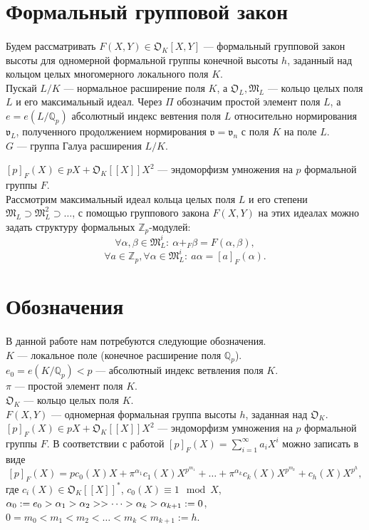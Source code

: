 \documentclass[a4paper]{article}
\newcommand{\Qp}{\mathbb{Q}_p}
\newcommand{\Zp}{\mathbb{Z}_p}
\newcommand{\ML}{\mathfrak{M}_L}
\newcommand{\OK}{\mathfrak{O}_K}
\newcommand{\OL}{\mathfrak{O}_L}
\newcommand{\val}{\mathfrak{v}}
\begin{document}
\section{Формальный групповой закон}
\paragraph{}
Будем рассматривать $F(X,Y)\in\OK[X,Y]$ --- формальный групповой закон высоты для одномерной формальной группы конечной высоты $h$, заданный над кольцом целых многомерного локального поля $K$.\\ 
Пускай $L/K$ --- нормальное расширение поля $K$, а $\OL,\ML$ --- кольцо целых поля $L$ и его максимальный идеал. Через $\Pi$ обозначим простой элемент поля $L$, а $e=e(L/\Qp)$ абсолютный индекс вевтения поля $L$ относительно нормирования $\val_L$, полученного продолжением нормирования $\val=\val_n$ с поля $K$ на поле $L$.\\
$G$ --- группа Галуа расширения $L/K$.

$[p]_F(X) \in pX+\OK[[X]]X^2$ --- эндоморфизм умножения на $p$ формальной группы $F$.\\
Рассмотрим максимальный идеал кольца целых поля $L$ и его степени $\ML\supset\ML^2\supset\dots$, с помощью группового закона $F(X,Y)$ на этих идеалах можно задать структуру формальных $\Zp$-модулей:
$$\forall\alpha,\beta\in\ML^i:\ \alpha+_F\beta=F(\alpha,\beta),$$
$$\forall a\in\Zp,\forall\alpha\in\ML^i:\ a\alpha=[a]_F(\alpha).$$

\section{Обозначения}

\paragraph{}

В данной работе нам потребуются следующие обозначения.\\
$K$ --- локальное поле (конечное расширение поля $\Qp$).\\
$e_0=e(K/\Qp)<p$ --- абсолютный индекс ветвления поля $K$.\\
$\pi$ --- простой элемент поля $K$.\\
$\OK$ --- кольцо целых поля $K$.\\
$F(X,Y)$ --- одномерная формальная группа высоты $h$, заданная над $\OK$.\\
$[p]_F(X) \in pX+\OK[[X]]X^2$ --- эндоморфизм умножения на $p$ формальной группы $F$. В соответствии с работой \cite{book2} $[p]_F(X)=\sum\limits_{i=1}^\infty a_iX^i$ можно записать в виде
$$[p]_F(X)=pc_0(X)X+\pi^{\alpha_1}c_1(X)X^{p^{m_1}}+\dots+\pi^{\alpha_k}c_k(X)X^{p^{m_k}}+c_h(X)X^{p^h},$$
где $c_i(X) \in \OK[[X]]^*$, $c_0(X) \equiv 1 \mod X$, $\alpha_0:=e_0>\alpha_1>\alpha_2>\linebreak>\dots>\alpha_k>\alpha_{k+1}:=0$, $0=m_0<m_1<m_2<\dots<m_k<m_{k+1}:=h$.
\end{document}

